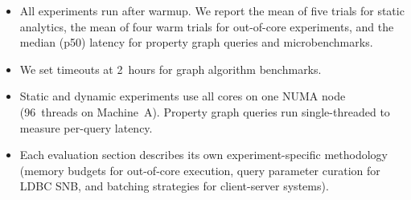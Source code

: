 \begin{itemize}
  \item All experiments run after warmup.
        We report the mean of five trials for static analytics, the mean of four warm trials for out-of-core experiments, and the median (p50) latency for property graph queries and microbenchmarks.
  \item We set timeouts at 2~hours for graph algorithm benchmarks.
  \item Static and dynamic experiments use all cores on one NUMA node (96~threads on Machine~A).
        Property graph queries run single-threaded to measure per-query latency.
  \item Each evaluation section describes its own experiment-specific methodology (memory budgets for out-of-core execution, query parameter curation for LDBC SNB, and batching strategies for client-server systems).
\end{itemize}
